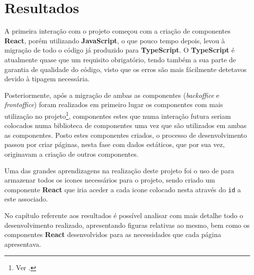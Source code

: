 \section{Resultados}

A primeira interação com o projeto começou com a criação de componentes \textbf{React}, porém utilizando \textbf{JavaScript}, o que pouco tempo depois, levou à migração de todo o código já produzido para \textbf{TypeScript}. O \textbf{TypeScript} é atualmente quase que um requisito obrigatório, tendo também a sua parte de garantia de qualidade do código, visto que os erros são mais fácilmente detetavos devido à tipagem necessária.

Posteriormente, após a migração de ambas as componentes (\textit{backoffice} e \textit{frontoffice}) foram realizados em primeiro lugar os componentes com mais utilização no projeto\footnote{Ver .}, componentes estes que numa interação futura seriam colocados numa biblioteca de componentes uma vez que são utilizados em ambas as componentes. Posto estes componentes criados, o processo de desenvolvimento passou por criar páginas, nesta fase com dados estáticos, que por sua vez, originavam a criação de outros componentes.

Uma das grandes aprendizagens na realização deste projeto foi o uso de  \textbf{} para armazenar todos os icones necessários para o projeto, sendo criado um componente \textbf{React} que iria aceder a cada icone colocado nesta  através do \texttt{id} a este associado.

No capítulo referente aos resultados é possível analisar com mais detalhe todo o desenvolvimento realizado, apresentando figuras relativas ao mesmo, bem como os componentes \textbf{React} desenvolvidos para as necessidades que cada página apresentava.